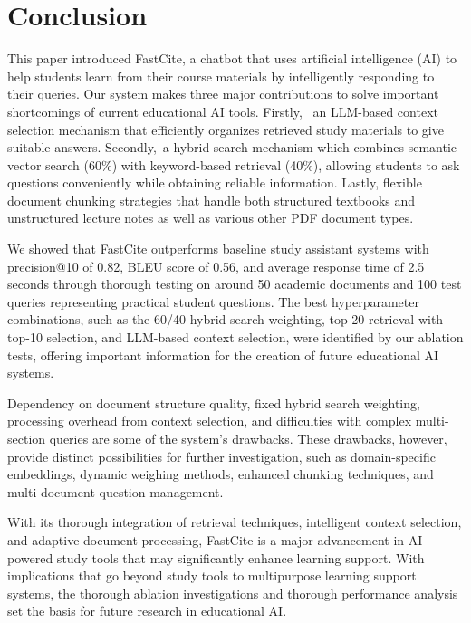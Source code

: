 \documentclass[runningheads]{llncs}
\begin{document}
%
%
\section{Conclusion}

This paper introduced FastCite, a chatbot that uses artificial intelligence (AI) to help students learn from their course materials by intelligently responding to their queries.  Our system makes three major contributions to solve important shortcomings of current educational AI tools. Firstly,  an LLM-based context selection mechanism that efficiently organizes retrieved study materials to give suitable answers. Secondly, a hybrid search mechanism which combines semantic vector search (60\%) with keyword-based retrieval (40\%), allowing students to ask questions conveniently while obtaining reliable information. Lastly, flexible document chunking strategies that handle both structured textbooks and unstructured lecture notes as well as various other PDF document types.

We showed that FastCite outperforms baseline study assistant systems with precision@10 of 0.82, BLEU score of 0.56, and average response time of 2.5 seconds through thorough testing on around 50 academic documents and 100 test queries representing practical student questions. The best hyperparameter combinations, such as the 60/40 hybrid search weighting, top-20 retrieval with top-10 selection, and LLM-based context selection, were identified by our ablation tests, offering important information for the creation of future educational AI systems.

Dependency on document structure quality, fixed hybrid search weighting, processing overhead from context selection, and difficulties with complex multi-section queries are some of the system's drawbacks. These drawbacks, however, provide distinct possibilities for further investigation, such as domain-specific embeddings, dynamic weighing methods, enhanced chunking techniques, and multi-document question management.

With its thorough integration of retrieval techniques, intelligent context selection, and adaptive document processing, FastCite is a major advancement in AI-powered study tools that may significantly enhance learning support. With implications that go beyond study tools to multipurpose learning support systems, the thorough ablation investigations and thorough performance analysis set the basis for future research in educational AI.
\end{document}
